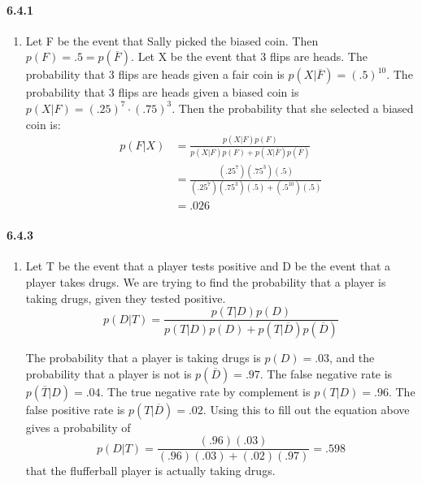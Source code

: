 \documentclass[11pt, letterpaper, twocolumn, fleqn]{article}
\begin{document}
\paragraph{6.4.1}
\begin{enumerate}
  \item Let F be the event that Sally picked the biased coin. Then $p(F) = .5 = p(\overline{F})$. Let X be the event that 3 flips are heads. The probability that 3 flips are heads given a fair coin is $p(X|\overline{F}) = (.5)^{10}$. The probability that 3 flips are heads given a biased coin is $p(X|F) = (.25)^7 \cdot (.75)^3$. Then the probability that she selected a biased coin is:
  \begin{align*}
    p(F|X) &= \frac{p(X|F)p(F)}{p(X|F)p(F) + p(X|\overline{F})p(\overline{F})} \\
    &= \frac{(.25^7)(.75^3)(.5)}{(.25^7)(.75^3)(.5) + (.5^{10})(.5)} \\
    &= .026
  \end{align*}
\end{enumerate}

\paragraph{6.4.3}
\begin{enumerate}
  \item Let T be the event that a player tests positive and D be the event that a player takes drugs. We are trying to find the probability that a player is taking drugs, given they tested positive.
    $$p(D|T) = \frac{p(T|D)p(D)}{p(T|D)p(D) + p(T|\overline{D})p(\overline{D})} $$
  
  The probability that a player is taking drugs is $p(D) = .03$, and the probability that a player is not is $p(\overline{D}) = .97$. The false negative rate is $p(\overline{T}|D) = .04$. The true negative rate by complement is $p(T|D)= .96$. The false positive rate is $p(T|\overline{D}) = .02$. Using this to fill out the equation above gives a probability of
    $$p(D|T) = \frac{(.96)(.03)}{(.96)(.03)+(.02)(.97)} = .598 $$
  that the flufferball player is actually taking drugs.
\end{enumerate}
\end{document}
